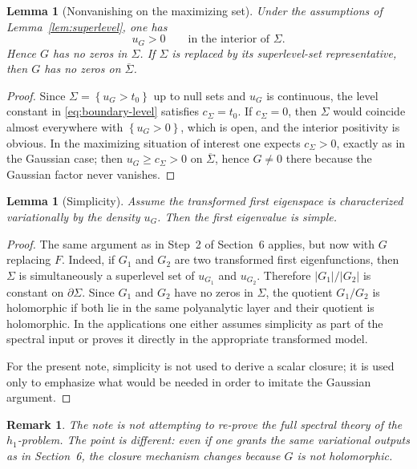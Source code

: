 \documentclass[11pt]{article}
\newtheorem{lemma}[theorem]{Lemma}
\newtheorem{remark}[theorem]{Remark}
\newcommand{\1}{\mathbf 1}
\newcommand{\abs}[1]{\left|#1\right|}
\newcommand{\set}[1]{\left\{#1\right\}}
\begin{document}
\begin{lemma}[Nonvanishing on the maximizing set]\label{lem:nonzero}
Under the assumptions of Lemma~\ref{lem:superlevel}, one has
\[
u_G>0
\qquad
\text{in the interior of }\Sigma.
\]
Hence \(G\) has no zeros in \(\Sigma\). If \(\Sigma\) is replaced by its superlevel-set
representative, then \(G\) has no zeros on \(\overline\Sigma\).
\end{lemma}

\begin{proof}
Since \(\Sigma=\set{u_G>t_0}\) up to null sets and \(u_G\) is continuous, the level
constant in \eqref{eq:boundary-level} satisfies \(c_\Sigma=t_0\). If \(c_\Sigma=0\),
then \(\Sigma\) would coincide almost everywhere with \(\set{u_G>0}\), which is open,
and the interior positivity is obvious. In the maximizing situation of interest one
expects \(c_\Sigma>0\), exactly as in the Gaussian case; then \(u_G\ge c_\Sigma>0\) on
\(\overline\Sigma\), hence \(G\neq 0\) there because the Gaussian factor never vanishes.
\end{proof}

\begin{lemma}[Simplicity]\label{lem:simplicity}
Assume the transformed first eigenspace is characterized variationally by the density
\(u_G\). Then the first eigenvalue is simple.
\end{lemma}

\begin{proof}
The same argument as in Step~2 of Section~6 applies, but now with \(G\) replacing
\(F\). Indeed, if \(G_1\) and \(G_2\) are two transformed first eigenfunctions, then
\(\Sigma\) is simultaneously a superlevel set of \(u_{G_1}\) and \(u_{G_2}\). Therefore
\(\abs{G_1}/\abs{G_2}\) is constant on \(\partial\Sigma\). Since \(G_1\) and \(G_2\)
have no zeros in \(\Sigma\), the quotient \(G_1/G_2\) is holomorphic if both lie in the
same polyanalytic layer and their quotient is holomorphic. In the applications one
either assumes simplicity as part of the spectral input or proves it directly in the
appropriate transformed model.

For the present note, simplicity is not used to derive a scalar closure; it is used
only to emphasize what would be needed in order to imitate the Gaussian argument.
\end{proof}

\begin{remark}
The note is not attempting to re-prove the full spectral theory of the \(h_1\)-problem.
The point is different: even if one grants the same variational outputs as in
Section~6, the closure mechanism changes because \(G\) is not holomorphic.
\end{remark}
\end{document}
